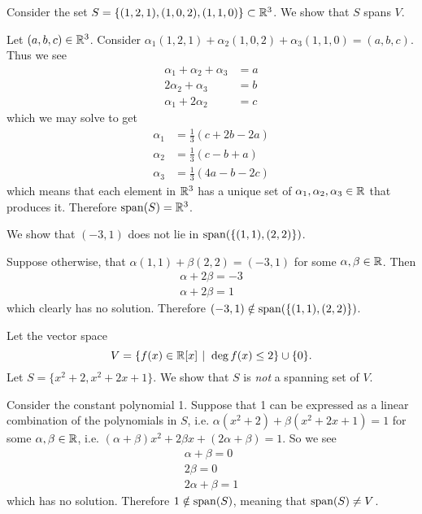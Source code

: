 \begin{example}
    Consider the set $S = \{(1, 2, 1), (1, 0, 2), (1, 1, 0)\} \subset \mathbb{R}^3$. We show that $S$ spans $V$.

    Let $(a, b, c) \in \mathbb{R}^3$. Consider $\alpha_1(1, 2, 1) + \alpha_2(1, 0, 2) + \alpha_3(1, 1, 0) = (a, b, c)$. Thus we see
    \begin{align*}
        \alpha_1 + \alpha_2 + \alpha_3 &= a\\
        2\alpha_2  + \alpha_3 &= b\\
        \alpha_1 + 2\alpha_2 &= c
    \end{align*}
    which we may solve to get
    \begin{align*}
        \alpha_1 &= \frac13(c + 2b - 2a)\\
        \alpha_2 &= \frac13(c - b + a)\\
        \alpha_3 &= \frac13(4a - b - 2c)
    \end{align*}
    which means that each element in $\mathbb{R}^3$ has a unique set of $\alpha_1, \alpha_2, \alpha_3 \in \mathbb{R}$ that produces it. Therefore $\mathrm{span}(S) = \mathbb{R}^3$.
\end{example}

\begin{example}
    We show that $(-3, 1)$ does not lie in $\mathrm{span}(\{(1,1), (2,2)\})$.

    Suppose otherwise, that $\alpha(1,1) + \beta(2,2) = (-3,1)$ for some $\alpha, \beta \in \mathbb{R}$. Then
    \begin{align*}
        \alpha + 2\beta = -3\\
        \alpha + 2\beta = 1
    \end{align*}
    which clearly has no solution. Therefore $(-3, 1) \notin \mathrm{span}(\{(1, 1), (2, 2)\})$.
\end{example}

\begin{example}
    Let the vector space
    \[
        V = \{f(x) \in \R[x] \vert \deg f(x) \leq 2\} \cup \{0\}.
    \]
    Let $S = \{x^2 + 2, x^2 + 2x + 1\}$. We show that $S$ is \textit{not} a spanning set of $V$.

    Consider the constant polynomial 1. Suppose that 1 can be expressed as a linear combination of the polynomials in $S$, i.e. $\alpha(x^2 + 2) + \beta(x^2+2x+1) = 1$ for some $\alpha, \beta \in \mathbb{R}$, i.e. $(\alpha + \beta)x^2 + 2\beta x + (2\alpha + \beta) = 1$. So we see
    \begin{align*}
        \alpha + \beta = 0\\
        2\beta = 0\\
        2\alpha + \beta = 1
    \end{align*}
    which has no solution. Therefore $1 \notin \mathrm{span}(S)$, meaning that $\mathrm{span}(S) \neq V$.
\end{example}

